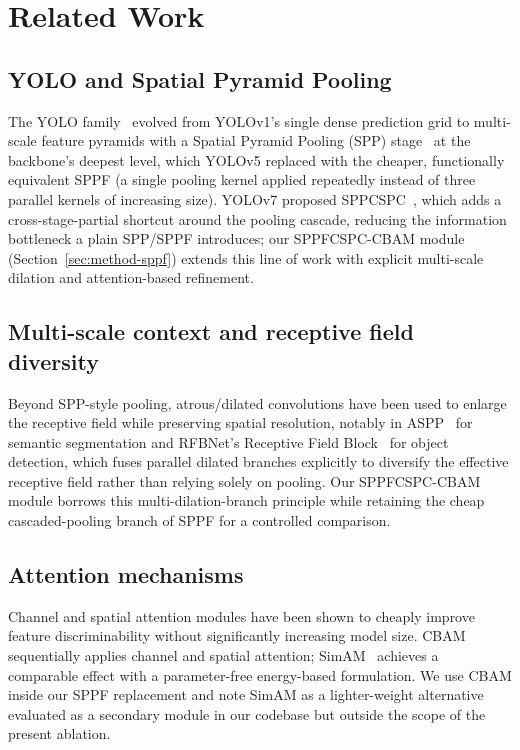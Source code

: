 \documentclass[conference]{IEEEtran}
\begin{document}
\section{Related Work}
\label{sec:related}

\subsection{YOLO and Spatial Pyramid Pooling}
The YOLO family~\cite{redmon2016yolo} evolved from YOLOv1's single dense
prediction grid to multi-scale feature pyramids with a Spatial Pyramid
Pooling (SPP) stage~\cite{he2015spp} at the backbone's deepest level, which
YOLOv5 replaced with the cheaper, functionally equivalent SPPF (a single
pooling kernel applied repeatedly instead of three parallel kernels of
increasing size). YOLOv7 proposed SPPCSPC~\cite{wang2023yolov7}, which adds
a cross-stage-partial shortcut around the pooling cascade, reducing the
information bottleneck a plain SPP/SPPF introduces; our SPPFCSPC-CBAM
module (Section~\ref{sec:method-sppf}) extends this line of work with
explicit multi-scale dilation and attention-based refinement.

\subsection{Multi-scale context and receptive field diversity}
Beyond SPP-style pooling, atrous/dilated convolutions have been used to
enlarge the receptive field while preserving spatial resolution, notably in
ASPP~\cite{chen2017deeplab} for semantic segmentation and RFBNet's
Receptive Field Block~\cite{liu2018rfb} for object detection, which fuses
parallel dilated branches explicitly to diversify the effective receptive
field rather than relying solely on pooling. Our SPPFCSPC-CBAM module
borrows this multi-dilation-branch principle while retaining the
cheap cascaded-pooling branch of SPPF for a controlled comparison.

\subsection{Attention mechanisms}
Channel and spatial attention modules have been shown to cheaply improve
feature discriminability without significantly increasing model size. CBAM
~\cite{woo2018cbam} sequentially applies channel and spatial attention;
SimAM~\cite{yang2021simam} achieves a comparable effect with a
parameter-free energy-based formulation. We use CBAM inside our SPPF
replacement and note SimAM as a lighter-weight alternative evaluated as a
secondary module in our codebase but outside the scope of the present
ablation.
\end{document}
